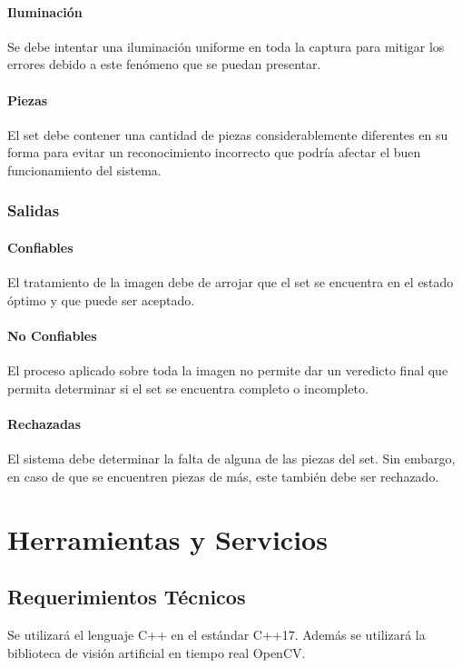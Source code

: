 \documentclass[letterpaper]{scrreprt}
\begin{document}
\subsubsection{Iluminación}
Se debe intentar una iluminación uniforme en toda la captura para mitigar los errores debido a este fenómeno que se puedan presentar.
\subsubsection{Piezas}
El set debe contener una cantidad de piezas considerablemente diferentes en su forma para evitar un reconocimiento incorrecto que podría afectar el buen funcionamiento del sistema.
\subsection{Salidas}
\subsubsection{Confiables}
El tratamiento de la imagen debe de arrojar que el set se encuentra en el estado óptimo y que puede ser aceptado.
\subsubsection{No Confiables}
El proceso aplicado sobre toda la imagen no permite dar un veredicto final que permita determinar si el set se encuentra completo o incompleto.
\subsubsection{Rechazadas}
El sistema debe determinar la falta de alguna de las piezas del set. Sin embargo, en caso de que se encuentren piezas de más, este también debe ser rechazado.


\chapter{Herramientas y Servicios}

\section{Requerimientos Técnicos}
Se utilizará el lenguaje C++ en el estándar C++17. Además se utilizará la biblioteca de visión artificial en tiempo real OpenCV.
\end{document}
